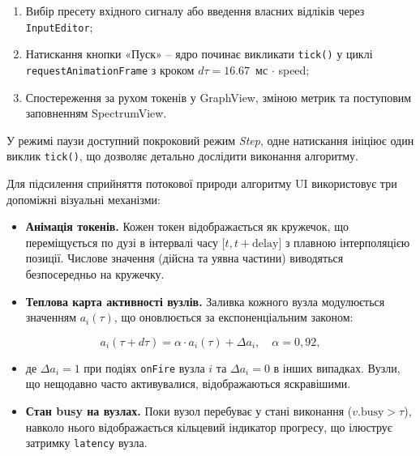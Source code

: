 \documentclass[
]{article}
\begin{document}
\begin{enumerate}
\def\labelenumi{\arabic{enumi}.}
\item
  Вибір пресету вхідного сигналу або введення власних відліків через
  \texttt{InputEditor};
\item
  Натискання кнопки «Пуск» -- ядро починає викликати
  \texttt{tick}\texttt{()} у циклі \texttt{requestAnimationFrame} з
  кроком \(d\tau = 16.67\)~мс \(\cdot\) speed;
\item
  Спостереження за рухом токенів у GraphView, зміною метрик та
  поступовим заповненням SpectrumView.
\end{enumerate}

У режимі паузи доступний покроковий режим \emph{Step}, одне натискання
ініціює один виклик \texttt{tick}\texttt{()}, що дозволяє детально
дослідити виконання алгоритму.

Для підсилення сприйняття потокової природи алгоритму UI використовує
три допоміжні візуальні механізми:

\begin{itemize}
\item
  \textbf{Анімація токенів.} Кожен токен відображається як кружечок, що
  переміщується по дузі в інтервалі часу
  \(\lbrack t,t + \text{delay}\rbrack\) з плавною інтерполяцією позиції.
  Числове значення (дійсна та уявна частини) виводяться безпосередньо на
  кружечку.
\item
  \textbf{Теплова карта активності вузлів.} Заливка кожного вузла
  модулюється значенням \(a_{i}(\tau)\), що оновлюється за
  експоненціальним законом:
\end{itemize}

\[a_{i}(\tau + d\tau) = \alpha \cdot a_{i}(\tau) + \Delta a_{i},\quad\alpha = 0,92,\]

\begin{itemize}
\item
  де \(\Delta a_{i} = 1\) при подіях \texttt{onFire} вузла \(i\) та
  \(\Delta a_{i} = 0\) в інших випадках. Вузли, що нещодавно часто
  активувалися, відображаються яскравішими.
\end{itemize}

\begin{itemize}
\item
  \textbf{Стан busy на вузлах.} Поки вузол перебуває у стані виконання
  (\(v.\text{busy} > \tau\)), навколо нього відображається кільцевий
  індикатор прогресу, що ілюструє затримку \texttt{latency} вузла.
\end{itemize}
\end{document}
